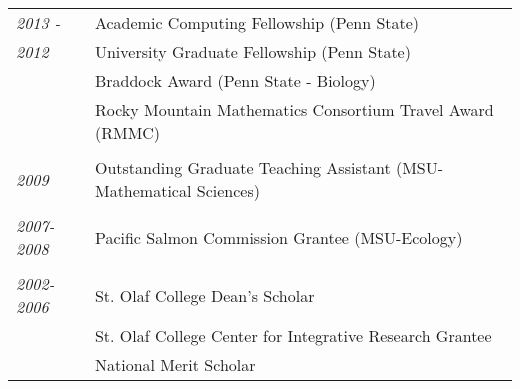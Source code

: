 \documentclass[9pt]{article}
\newenvironment{outerlist}[1][\enskip\textbullet]%
        {\begin{itemize}[#1]}{\end{itemize}%
         }
\newenvironment{innerlist}[1][\enskip\textbullet]%
        {\begin{compactitem}[#1]}{\end{compactitem}}
\begin{document}
\vspace{.05in}


\vspace{.15in}

\vspace{.15in}

\begin{tabular}{p{.5cm} p{15cm}}
\hspace{-1.75cm} \footnotesize{\textit{2013 - }} & \hspace{-.5cm}Academic
	Computing Fellowship (Penn State)\\
\hspace{-1.75cm} \footnotesize{\textit{2012}} & \hspace{-.5cm}University Graduate Fellowship (Penn State)\\
& \hspace{-.5cm}Braddock Award (Penn State - Biology) \\
& \hspace{-.5cm}Rocky Mountain Mathematics Consortium Travel Award (RMMC)\\
\\
\hspace{-1.75cm} \footnotesize{\textit{2009}} & \hspace{-.5cm}Outstanding Graduate Teaching Assistant (MSU-Mathematical Sciences)\\
\\
\hspace{-1.75cm} \footnotesize{\textit{2007-2008}} & \hspace{-.5cm}Pacific Salmon Commission Grantee (MSU-Ecology) \\
\\
\hspace{-1.75cm} \footnotesize{\textit{2002-2006}} & \hspace{-.5cm}St. Olaf College Dean's Scholar \\
& \hspace{-.5cm}St. Olaf College Center for Integrative Research Grantee \\
& \hspace{-.5cm}National Merit Scholar\\
\end{tabular}
\end{document}

